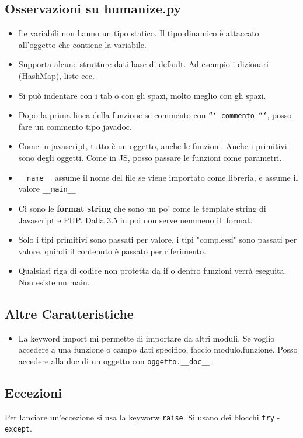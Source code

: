 \documentclass[a4paper,12pt]{article}
\begin{document}
\subsection{Osservazioni su humanize.py}
\begin{itemize}
	\item Le variabili non hanno un tipo statico. Il tipo dinamico è attaccato all'oggetto che contiene la variabile.
	\item Supporta alcune strutture dati base di default. Ad esempio i dizionari (HashMap), liste ecc.
	\item Si può indentare con i tab o con gli spazi, molto meglio con gli spazi.
	\item Dopo la prima linea della funzione se commento con \texttt{``` commento ```}, posso fare un commento tipo javadoc.
	\item Come in javascript, tutto è un oggetto, anche le funzioni. Anche i primitivi sono degli oggetti. Come in JS, posso passare le funzioni come parametri.
	\item \texttt{\_\_name\_\_} assume il nome del file se viene importato come libreria, e assume il valore \texttt{\_\_main\_\_}
	\item Ci sono le \textbf{format string} che sono un po' come le template string di Javascript e PHP. Dalla 3.5 in poi non serve nemmeno il .format.
	\item Solo i tipi primitivi sono passati per valore, i tipi "complessi" sono passati per valore, quindi il contenuto è passato per riferimento.
	\item Qualsiasi riga di codice non protetta da if o dentro funzioni verrà eseguita. Non esiste un main.
\end{itemize}

\subsection{Altre Caratteristiche}
\begin{itemize}
	\item La keyword import mi permette di importare da altri moduli. Se voglio accedere a una funzione o campo dati specifico, faccio modulo.funzione. Posso accedere alla doc di un oggetto con \texttt{oggetto.\_\_doc\_\_}.
\end{itemize}

\subsection{Eccezioni}
Per lanciare un'eccezione si usa la keyworw \texttt{raise}. Si usano dei blocchi \texttt{try} - \texttt{except}.
\end{document}
